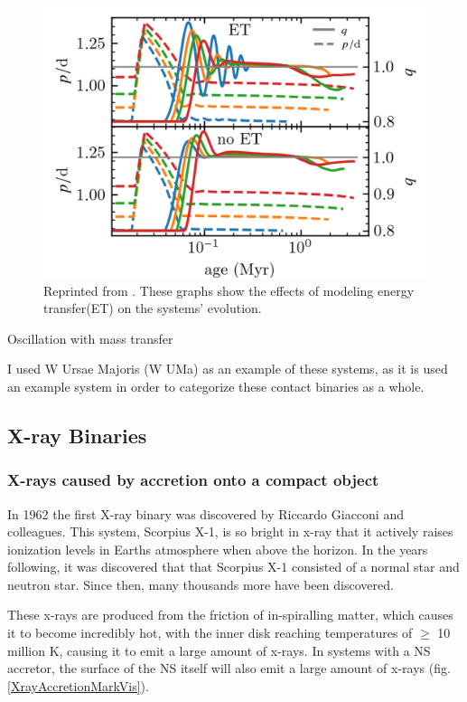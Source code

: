 \documentclass[12pt, a4paper]{article}
\begin{document}
        \begin{figure}[H]
            \centering
            \includegraphics[scale = .3]{figs/reused-figs/q-ratio_evolution_farby.png}
            \caption{Reprinted from \parencite{Fabry_2025}. These graphs show the effects of modeling energy transfer(ET) on the systems' evolution.}
            \label{qEvolution}
        \end{figure}

        Oscillation with mass transfer

        
        I used W Ursae Majoris (W UMa) as an example of these systems, as it is used an example system in order to categorize these contact binaries as a whole.
    \subsection{X-ray Binaries} 
        \subsubsection{X-rays caused by accretion onto a compact object} \label{XrayAccretion}
            In 1962 the first X-ray binary was discovered by Riccardo Giacconi and colleagues. This system, Scorpius X-1, is so bright in x-ray that it actively raises ionization levels in Earths atmosphere when above the horizon. \parencite{TaurisvandenHeuvel+2023} \parencite{Giacconi_1962} In the years following, it was discovered that that Scorpius X-1 consisted of a normal star and neutron star. Since then, many thousands more have been discovered\parencite{Haardt_1993}.

            These x-rays are produced from the friction of in-spiralling matter, which causes it to become incredibly hot, with the inner disk reaching temperatures of $\geq$ 10 million K, causing it to emit a large amount of x-rays. In systems with a NS accretor, the surface of the NS itself will also emit a large amount of x-rays \parencite{TaurisvandenHeuvel+2023} (fig. \ref{XrayAccretionMarkVis}). 
\end{document}
